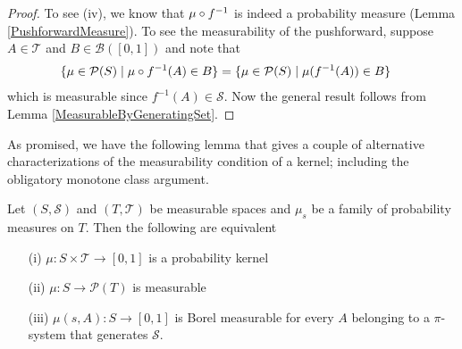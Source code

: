 \begin{proof}
To see (iv), we know that $\mu \circ f^{-1}$ is indeed a
probability measure (Lemma \ref{PushforwardMeasure}).  To see the
measurability of the pushforward, suppose $A \in \mathcal{T}$ and $B
\in \mathcal{B}([0,1])$ and note that 
\begin{align*}
\lbrace \mu \in \mathcal{P}(S) \mid \mu \circ f^{-1}(A) \in B
  \rbrace
&=
\lbrace \mu \in \mathcal{P}(S) \mid \mu(f^{-1}(A)) \in B
  \rbrace
\end{align*}
which is measurable since $f^{-1}(A) \in \mathcal{S}$.  Now the
general result follows from Lemma \ref{MeasurableByGeneratingSet}.
\end{proof}

As promised, we have the following lemma that gives a couple of
alternative characterizations of the measurability condition of a
kernel; including the obligatory monotone class argument.
\begin{lem}\label{KernelMeasurability}Let $(S, \mathcal{S})$ and $(T, \mathcal{T})$ be measurable
  spaces and $\mu_s$ be a family of probability measures on $T$.  Then
  the following are equivalent
\begin{itemize}
\item[(i)]$\mu : S \times \mathcal{T} \to [0,1]$ is a probability kernel
\item[(ii)]$\mu : S \to \mathcal{P}(T)$ is measurable
\item[(iii)]$\mu(s, A) : S \to [0,1]$ is Borel measurable for every $A$
  belonging to a $\pi$-system that generates $\mathcal{S}$.
\end{itemize}
\end{lem}
